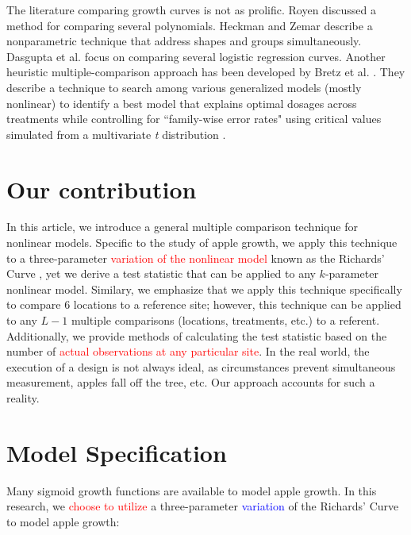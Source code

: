 \documentclass[useAMS]{cJAS2e}
\newcommand{\added}[1]{\textcolor{blue}{#1}}
\newcommand{\changed}[1]{\textcolor{red}{#1}}
\begin{document}
The literature comparing growth curves is not as prolific.  Royen \citet{Royen:1984} discussed a method for comparing several polynomials. Heckman and Zemar \citet{Heckman:2000} describe a nonparametric technique that address shapes and groups simultaneously.  Dasgupta et al. \citet{Dasgupta:2000} focus on comparing several logistic regression curves.  Another heuristic multiple-comparison approach has been developed by Bretz et al. \citet{Bretz:2005}.  They describe a technique to search among various generalized models (mostly nonlinear) to identify a best model that explains optimal dosages across treatments while controlling for ``family-wise error rates"  using critical values simulated from a multivariate \emph{t} distribution \citep{Genz:2004}.



\section{Our contribution}\label{sec:our}
In this article, we introduce a general multiple comparison technique for nonlinear models.  Specific to the study of apple growth, we apply this technique to a three-parameter  \changed{variation of the nonlinear model} known as the Richards' Curve \citep{Richards:1959}, yet we derive a test statistic that can be applied to any $k$-parameter nonlinear model.  Similary, we emphasize that we apply this technique specifically to compare 6 locations to a reference site; however, this technique can be applied to any $L-1$ multiple comparisons (locations, treatments, etc.) to a referent.  Additionally, we provide methods of calculating the test statistic based on the number of \changed{actual observations at any particular site}.  In the real world, the execution of a design is not always ideal, as circumstances prevent simultaneous measurement, apples fall off the tree, etc.  Our approach accounts for such a reality.



\section{Model Specification}\label{sec:growth}

Many sigmoid growth functions are available to model apple growth.  In this research, we \changed{choose to utilize} a three-parameter \added{variation} of the  Richards' Curve \citep{Richards:1959} to model apple growth: 
\end{document}
